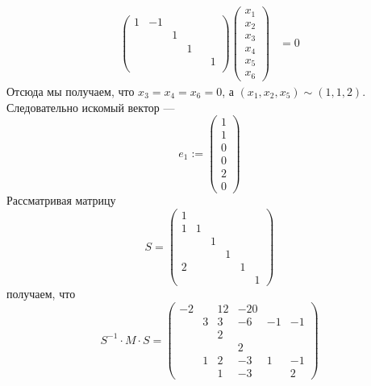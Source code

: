 \documentclass[12pt,a4paper]{article}
\begin{document}
\begin{problem*}
\begin{enumerate}
\begin{align*}
\begin{pmatrix}
                        1& -1& & & & \\
                        & & 1& & & \\
                        & & & 1& & \\
                        & & & & & 1\\
                    \end{pmatrix}
                    \begin{pmatrix}
                        x_1\\x_2\\x_3\\x_4\\x_5\\x_6
                    \end{pmatrix}
                    &= 0
                \end{align*}
                Отсюда мы получаем, что $x_3 = x_4 = x_6 = 0$, а $(x_1, x_2, x_5) \sim (1, 1, 2)$. Следовательно искомый вектор ---
                \[
                    e_1 :=
                    \begin{pmatrix}
                        1\\1\\0\\0\\2\\0
                    \end{pmatrix}
                \]
                Рассматривая матрицу
                \[
                    S =
                    \begin{pmatrix}
                        1&&&&&\\
                        1& 1&&&&\\
                        && 1&&&\\
                        &&& 1&&\\
                        2&&&& 1&\\
                        &&&&& 1
                    \end{pmatrix}
                \]
                получаем, что
                \[
                    S^{-1} \cdot M \cdot S =
                    \begin{pmatrix}
                        -2&& 12& -20&&\\
                        & 3& 3& -6& -1& -1\\
                        && 2&&&\\
                        &&& 2&&\\
                        & 1& 2& -3& 1& -1\\
                        && 1& -3&&2 
                    \end{pmatrix}
                \]
            

\end{enumerate}
\end{problem*}
\end{document}
